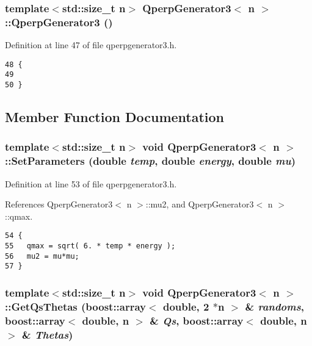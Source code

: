 \subsubsection{\setlength{\rightskip}{0pt plus 5cm}template$<$std::size\_\-t n$>$ {\bf QperpGenerator3}$<$ n $>$::{\bf QperpGenerator3} ()\hspace{0.3cm}{\tt  [inline]}}\label{classQperpGenerator3_3aeef790166a41a08d7dc41ee1ec64d5}




Definition at line 47 of file qperpgenerator3.h.

\begin{Code}\begin{verbatim}48 {
49 
50 }
\end{verbatim}
\end{Code}




\subsection{Member Function Documentation}
\subsubsection{\setlength{\rightskip}{0pt plus 5cm}template$<$std::size\_\-t n$>$ void {\bf QperpGenerator3}$<$ n $>$::SetParameters (double {\em temp}, double {\em energy}, double {\em mu})\hspace{0.3cm}{\tt  [inline]}}\label{classQperpGenerator3_302275d11ca9e11bfbcde1d3e9167d1a}




Definition at line 53 of file qperpgenerator3.h.

References QperpGenerator3$<$ n $>$::mu2, and QperpGenerator3$<$ n $>$::qmax.

\begin{Code}\begin{verbatim}54 {
55   qmax = sqrt( 6. * temp * energy );
56   mu2 = mu*mu;
57 }
\end{verbatim}
\end{Code}


\subsubsection{\setlength{\rightskip}{0pt plus 5cm}template$<$std::size\_\-t n$>$ void {\bf QperpGenerator3}$<$ n $>$::GetQsThetas (boost::array$<$ double, 2 $\ast$n $>$ \& {\em randoms}, boost::array$<$ double, n $>$ \& {\em Qs}, boost::array$<$ double, n $>$ \& {\em Thetas})\hspace{0.3cm}{\tt  [inline]}}\label{classQperpGenerator3_0258a688d52a150065e00b0013373b6e}




